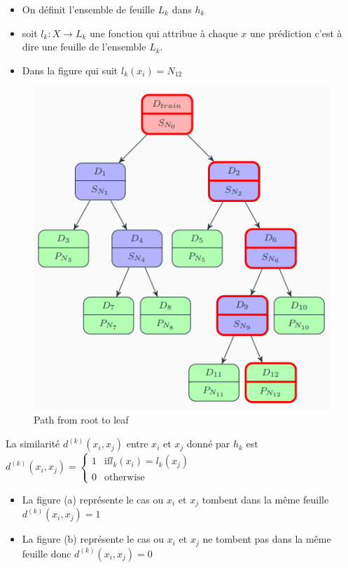 \documentclass[12pt,a4paper]{report}
\begin{document}
\begin{itemize}
	\item On définit l'ensemble de feuille $L_k$ dans $h_k$
	\item soit $l_k : X \rightarrow L_k$ une fonction qui attribue à chaque 					$x$ une prédiction c'est à dire une feuille de l'ensemble $L_k$.
	\item Dans la figure qui suit $l_k(x_i) = N_{12}$
\end{itemize}
\begin{figure}[!h]
    \vspace{-0.9cm}

	\centering
    \includegraphics[height=0.5\textwidth]{tree_path.png}
     \caption{Path from root to leaf}
\end{figure}


La similarité $d^{(k)}(x_i,x_j)$ entre $x_i$ et $x_j$ donné par $h_k$ est
$ d^{(k)}(x_i,x_j) = \begin{cases} 1 & \text{if} l_k(x_i) = l_k(x_j)\\ 0 & \text{otherwise} \end{cases} $\
\begin{itemize}
\item La figure (a) représente le cas ou $x_i$ et $x_j$ tombent dans la même feuille $ d^{(k)}(x_i,x_j) =1$
\item La figure (b) représente le cas ou $x_i$ et $x_j$ ne tombent pas dans la même feuille donc $ d^{(k)}(x_i,x_j) = 0$
\end{itemize}
\end{document}
